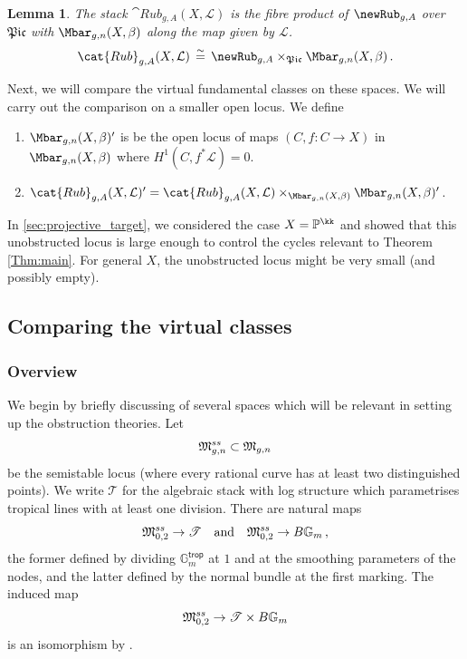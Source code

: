 \documentclass[a4paper,12pt]{article} %
\newcommand{\on}[1]{\operatorname{#1}}
\newcommand{\bb}[1]{{\mathbb{#1}}}
\newcommand{\cl}[1]{{\mathscr{#1}}}
\newcommand{\ca}[1]{{\mathcal{#1}}}
\theoremstyle{definition}
\theoremstyle{plain}%
\newtheorem{lemma}[definition]{Lemma}
\newcommand{\MbarX}{\Mbar_{g,n}(X, \beta)}
\newcommand{\Picabs}{\mathfrak{Pic}}
\begin{document}
\begin{lemma}
The stack $\cat{Rub}_{g,A}(X, \ca L)$ is the fibre product of $\newRub_{g,A}$ over $\Picabs$ with $\MbarX$ along the map given by $\ca L$. %
$$\cat{Rub}_{g,A}(X, \ca L)\,  \stackrel{\sim}{=}\,  \newRub_{g,A} \times _\Picabs \MbarX\, .$$
\end{lemma}

Next, we will compare the virtual fundamental classes on these
spaces. We will carry out the comparison on a smaller open locus.  
We define 
\begin{enumerate}
\item[(i)]
$\MbarX'$ is be the open locus of maps
$(C, f\colon C \to X)$ in $\MbarX$ where $H^1(C, f^*\ca L) = 0$.
\item[(ii)]
$\cat{Rub}_{g,A}(X, \ca L)' = \cat{Rub}_{g,A}(X, \ca L) \times_{\MbarX} \MbarX'$. 
\end{enumerate}
In  \cref{sec:projective_target}, we considered the case $X = \bb P^\kk$
and showed that this unobstructed locus is large enough
to control the cycles relevant to Theorem \ref{Thm:main}. For general $X$,
the unobstructed  locus might be very small (and possibly empty). 



\subsection{Comparing the virtual classes}\label{sec:comparing_virtual_classes}
\subsubsection{Overview}
We begin by briefly discussing of several spaces which will be relevant in setting up the obstruction theories. Let $$\frak M_{g, n}^{ss}\subset \frak{M}_{g,n}$$
be the semistable locus (where every rational curve has at least two distinguished points).
We write $\cl T$ for the algebraic stack with log structure which parametrises tropical lines with at least one division. %
There are natural maps $$\frak M_{0,2}^{ss} \to \cl T\ \ \ \text{and}\ \ \  \frak M_{0,2}^{ss} \to B\bb G_m\, ,$$
the former defined by dividing $\bb G_m^{\mathsf{trop}}$ at $1$ and at the smoothing parameters of the nodes, and the latter defined by the normal bundle at the first marking. The induced map 
\begin{equation}
\frak M_{0,2}^{ss} \to \cl T\times B\bb G_m
\end{equation}
is an isomorphism by \cite[Proposition 3.3.3]{Abramovich2013Expanded-degene}. %
\end{document}
